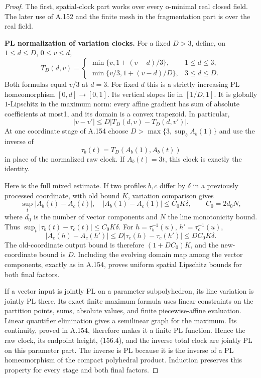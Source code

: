 \begin{proof}
The first, spatial-clock part works over every o-minimal real
closed field. The later use of A.152 and the finite mesh in
the fragmentation part is over the real field.

\textbf{PL normalization of variation clocks.}\quad
For a fixed $D>3$, define, on $1\le d\le D$, $0\le v\le d$,
\[
 T_D(d,v)=
 \begin{cases}
 \min\{v,1+(v-d)/3\},&1\le d\le3,\\
 \min\{v/3,1+(v-d)/D\},&3\le d\le D.
 \end{cases}
 \tag{156.2}
\]
Both formulas equal $v/3$ at $d=3$. For fixed $d$ this is a
strictly increasing PL homeomorphism $[0,d]\to[0,1]$.
Its vertical slopes lie in $[1/D,1]$. It is globally
$1$-Lipschitz in the maximum norm: every affine gradient
has sum of absolute coefficients at most1, and its domain
is a convex trapezoid. In particular,
\[
 |v-v'|\le D|T_D(d,v)-T_D(d,v')|.
 \tag{156.3}
\]
At one coordinate stage of A.154 choose
$D>\max\{3,\sup_b A_b(1)\}$ and use the inverse of
\[
 \tau_b(t)=T_D(A_b(1),A_b(t))
 \tag{156.4}
\]
in place of the normalized raw clock. If $A_b(t)=3t$,
this clock is exactly the identity.

Here is the full mixed estimate. If two profiles $b,c$
differ by $\delta$ in a previously processed coordinate,
with old bound $K$, variation comparison gives
\[
 \sup_t|A_b(t)-A_c(t)|,\quad |A_b(1)-A_c(1)|
       \le C_0K\delta,\qquad C_0=2d_0N,
\]
where $d_0$ is the number of vector components and $N$ the
line monotonicity bound. Thus
$\sup_t|\tau_b(t)-\tau_c(t)|\le C_0K\delta$.
For $h=\tau_b^{-1}(u)$, $h'=\tau_c^{-1}(u)$,
\[
 |A_c(h)-A_c(h')|
 \le D|\tau_c(h)-\tau_c(h')|
 \le DC_0K\delta.
 \tag{156.5}
\]
The old-coordinate output bound is therefore
$(1+DC_0)K$, and the new-coordinate bound is $D$.
Including the evolving domain map among the vector
components, exactly as in A.154, proves uniform spatial
Lipschitz bounds for both final factors.

If a vector input is jointly PL on a parameter subpolyhedron,
its line variation is jointly PL there. Its exact finite
maximum formula uses linear constraints on the partition
points, sums, absolute values, and finite piecewise-affine
evaluation. Linear quantifier elimination gives a semilinear
graph for the maximum. Its continuity, proved in A.154,
therefore makes it a finite PL function. Hence the raw
clock, its endpoint height, (156.4), and the inverse total
clock are jointly PL on this parameter part. The inverse
is PL because it is the inverse of a PL homeomorphism of
the compact polyhedral product. Induction preserves this
property for every stage and both final factors.


\end{proof}
